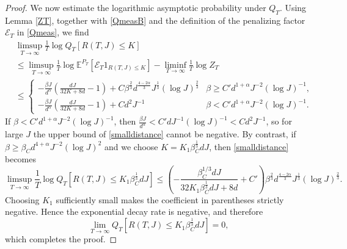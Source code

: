 \documentclass[10pt,a4paper]{amsart}
\newcommand{\E}{\mathbb{E}}
\begin{document}
\begin{proof}
We now estimate the logarithmic asymptotic probability under $Q_T$. Using Lemma \ref{ZT}, together with \eqref{QmeasB} and the definition of the penalizing factor $\mathcal{E}_T$ in \eqref{Qmeas}, we find
\begin{equation}
\label{smalldistance}
\begin{split}
    &\limsup_{T\to \infty}\frac{1}{T}\log Q_T\left[R(T,J)\leq K\right]\\
    &\leq\limsup_{T\to \infty}\frac{1}{T}\log \E^{P_T}\left[\mathcal{E}_T1_{R(T,J)\leq K}\right]-\liminf_{T\to\infty}\frac{1}{T}\log Z_T\\
    &\leq\begin{cases}
            -\frac{\beta J}{d^{\alpha}}\left(\frac{d J}{32K+8d}-1\right)+C\beta^{\frac{2}{3}}d^{\frac{4-2\alpha}{3}}J^{\frac{1}{3}}(\log J)^{\frac{2}{3}} & \beta\geq C'd^{1+\alpha}J^{-2}(\log J)^{-1},\\
            -\frac{\beta J}{d^{\alpha}}\left(\frac{d J}{32K+8d}-1\right)+Cd^2J^{-1}&\beta<C'd^{1+\alpha}J^{-2}(\log J)^{-1}.\end{cases}
    \end{split}
\end{equation}
If $\beta<C'd^{1+\alpha}J^{-2}(\log J)^{-1}$, then $\frac{\beta J}{d^\alpha}<C'd J^{-1}(\log J)^{-1}<Cd^2J^{-1}$, so for large $J$ the upper bound of \eqref{smalldistance} cannot be negative. By contrast, if $\beta \geq\beta_Cd^{4+\alpha}J^{-2}(\log J)^{2}$ and we choose $K=K_1\beta_C^{\frac{1}{3}}d J$, then \eqref{smalldistance} becomes
\begin{equation*}
    \limsup_{T\to \infty}\frac{1}{T}\log Q_T\left[R(T,J)\leq K_1\beta_C^{\frac{1}{3}}d J\right]\leq \left(-\frac{\beta_C^{1/3}d J}{32K_1\beta_C^{\frac{1}{3}}d J+8d}+C'\right)\beta^{\frac{2}{3}}d^{\frac{4-2\alpha}{3}}J^{\frac{1}{3}}(\log J)^{\frac{2}{3}}.
\end{equation*}
Choosing $K_1$ sufficiently small makes the coefficient in parentheses strictly negative. Hence the exponential decay rate is negative, and therefore
\begin{equation*}
    \lim_{T\to \infty}Q_T\left[R(T,J)\leq K_1\beta_C^{\frac{1}{3}}d J\right]=0,
\end{equation*}
which completes the proof.
\end{proof}
\end{document}
